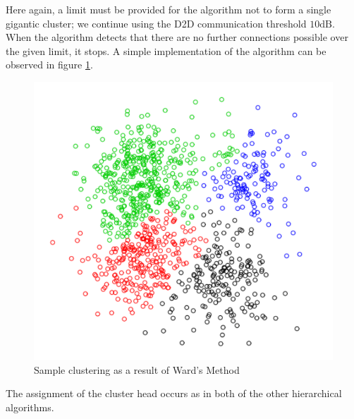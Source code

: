 Here again, a limit must be provided for the algorithm not to form a single gigantic cluster; we continue using the D2D communication threshold $10 \text{dB}$. When the algorithm detects that there are no further connections possible over the given limit, it stops. A simple implementation of the algorithm can be observed in figure \ref{fig:ward_math}.

\begin{figure}
\centering
\includegraphics[width=.4\linewidth]{figures/ward_math}
\caption{Sample clustering as a result of Ward's Method \cite{Shalizi2009}}
\label{fig:ward_math}
\end{figure}

The assignment of the cluster head occurs as in both of the other hierarchical algorithms.